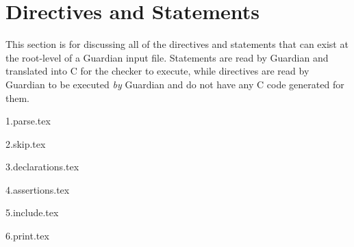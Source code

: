 
\section{Directives and Statements}
{
	This section is for discussing all of the directives and statements that can
	exist at the root-level of a Guardian input file.
	Statements are read by Guardian and translated into C for the checker to
	execute, while directives are read by Guardian to be executed \textit{by}
	Guardian and do not have any C code generated for them.
	
	{1.parse.tex}
	
	{2.skip.tex}
	
	{3.declarations.tex}
	
	{4.assertions.tex}
	
	{5.include.tex}
	
	{6.print.tex}
	
}


